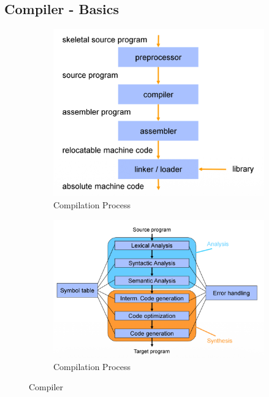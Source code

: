 \subsection{Compiler - Basics}
\begin{figure}[h]
	\begin{center}
	\begin{subfigure}[b]{0.4\textwidth}
		\includegraphics[width=\textwidth]{images/Compilation_process.png}
		\caption{Compilation Process}
		\label{fig:comp_process}
	\end{subfigure}
	\hfill
	\begin{subfigure}[b]{0.5\textwidth}
		\includegraphics[width=\textwidth]{images/Compilor_phases.png}
		\caption{Compilation Process}
		\label{fig:comp_process}
	\end{subfigure}
	\caption{Compiler}
\end{center}
\end{figure}


